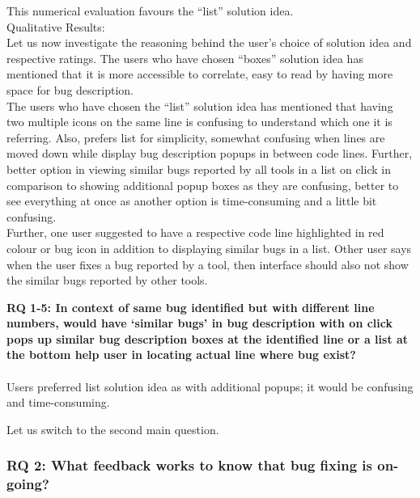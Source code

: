 This numerical evaluation favours the “list” solution idea. \\


Qualitative Results: \\

Let us now investigate the reasoning behind the user’s choice of solution idea and respective ratings. The users who have chosen “boxes” solution idea has mentioned that it is more accessible to correlate, easy to read by having more space for bug description. \\

The users who have chosen the “list” solution idea has mentioned that having two multiple icons on the same line is confusing to understand which one it is referring. Also, prefers list for simplicity, somewhat confusing when lines are moved down while display bug description popups in between code lines. Further,  better option in viewing similar bugs reported by all tools in a list on click in comparison to showing additional popup boxes as they are confusing, better to see everything at once as another option is time-consuming and a little bit confusing. \\

Further, one user suggested to have a respective code line highlighted in red colour or bug icon in addition to displaying similar bugs in a list. Other user says when the user fixes a bug reported by a tool, then interface should also not show the similar bugs reported by other tools. \\

\begin{myboxi}{{\textbf{RQ 1-5: In context of same bug identified but with different line numbers, would have ‘similar bugs’ in bug description with on click pops up similar bug description boxes at the identified line or a list at the bottom help user in locating actual line where bug exist?}}}
	\\ \\ Users preferred list solution idea as with additional popups; it would be confusing and time-consuming. \\
\end{myboxi}


Let us switch to the second main question.

\subsubsection{RQ 2: What feedback works to know that bug fixing is on-going?}

